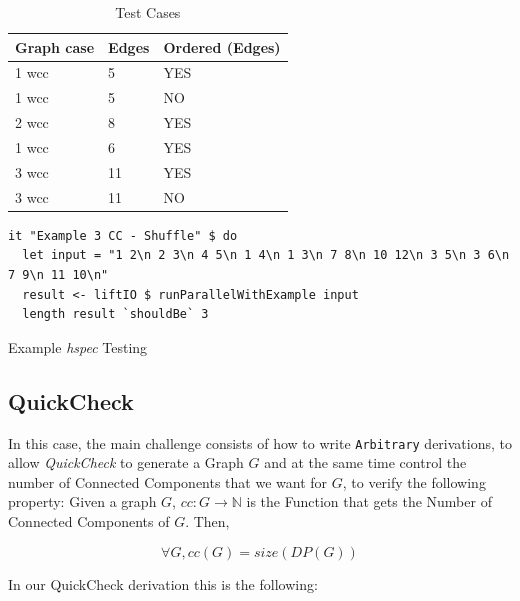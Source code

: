 \documentclass[preprint]{elsarticle}
\begin{document}
\begin{table}[H]
  \centering
  \begin{tabular}{|l|l|l|}
   \hline
   Graph case & Edges & Ordered (Edges)\\
   \hline
   1 \acrshort{wcc} & 5 & YES \\
   \hline
   1 \acrshort{wcc} & 5 & NO \\
   \hline
   2 \acrshort{wcc} & 8 & YES \\
   \hline
   1 \acrshort{wcc} & 6 & YES \\
   \hline
   3 \acrshort{wcc} & 11 & YES \\
   \hline
   3 \acrshort{wcc} & 11 & NO \\
   \hline
  \end{tabular}
 \caption{Test Cases}
 \label{table:apx:1}
 \end{table}

\begin{listing}[H]
\begin{verbatim}      
it "Example 3 CC - Shuffle" $ do
  let input = "1 2\n 2 3\n 4 5\n 1 4\n 1 3\n 7 8\n 10 12\n 3 5\n 3 6\n 7 9\n 11 10\n"
  result <- liftIO $ runParallelWithExample input
  length result `shouldBe` 3
\end{verbatim}
\caption{Example \textit{hspec} Testing}
\label{src:haskell:6}
\end{listing}

\subsection{QuickCheck}\label{Quick}
In this case, the main challenge consists of how to write \texttt{Arbitrary} derivations, to 
allow \textit{QuickCheck} to generate a Graph $G$ and at the same time control the number of Connected Components that we want for $G$, to verify the following property: Given a graph $G$, $cc : G \to \mathbb{N}$ is the Function that gets the Number of Connected Components of $G$.
Then,

\begin{equation}
  \forall G, cc(G) = size(DP(G))
\end{equation}

In our QuickCheck derivation this is the following:
\end{document}
